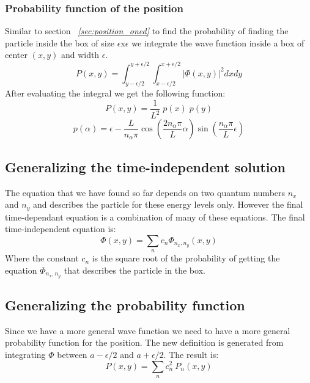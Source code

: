 \documentclass[a4paper, 10pt]{article}
\begin{document}
        \subsubsection{Probability function of the position}
        Similar to section \emph{~\ref{sec:position_oned}} to find the
        probability of finding the particle inside the box of size
        $\epsilon$x$\epsilon$ we integrate the wave function inside a
        box of center $(x,y)$ and width $\epsilon$.
        $$ P(x, y) = \int^{y+\epsilon/2}_{y-\epsilon/2}\int^{x+\epsilon/2}_{x-\epsilon/2}
          |\Phi(x, y)|^2 dx dy $$
        After evaluating the integral we get the following function:
        \begin{equation} \label{eq:position_twod_equation}
            P(x, y) = \frac{1}{L^2} \; p(x) \; p(y)
        \end{equation}
        $$
        p(\alpha) = \epsilon - \frac{L}{n_\alpha\pi} \cos\left( \frac{2n_\alpha\pi}{L}\alpha \right)
        \sin\left( \frac{n_\alpha\pi}{L} \epsilon\right)
        $$

        \subsection{Generalizing the time-independent solution}
        The equation that we have found so far depends on two quantum numbers
        $n_x$ and $n_y$ and describes the particle for these energy levels only.
        However the final time-dependant equation is a combination of many of these
        equations. The final time-independent equation is:
        \begin{equation} \label{eq:general_position}
            \Phi(x,y) = \sum_{n} c_n \Phi_{n_x, n_y}(x,y)
        \end{equation}
        Where the constant $c_n$ is the square root of the probability of getting
        the equation $\Phi_{n_x, n_y}$ that describes the particle in the box.

        \subsection{Generalizing the probability function}
        Since we have a more general wave function we need to have a more general
        probability function for the position. The new definition is generated from
        integrating $\Phi$ between $a-\epsilon/2$ and $a+\epsilon/2$. The result is:
        $$ P(x, y) = \sum_{n} c^2_n \: P_n(x, y)$$
\end{document}
